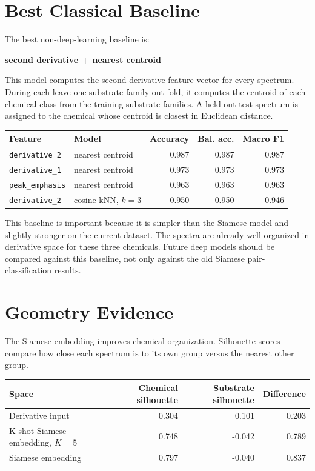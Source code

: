 \documentclass[11pt]{article}
\begin{document}
\section*{Best Classical Baseline}

The best non-deep-learning baseline is:

\begin{center}
\textbf{second derivative + nearest centroid}
\end{center}

This model computes the second-derivative feature vector for every spectrum. During each leave-one-substrate-family-out fold, it computes the centroid of each chemical class from the training substrate families. A held-out test spectrum is assigned to the chemical whose centroid is closest in Euclidean distance.

\begin{center}
\begin{tabular}{llrrr}
\toprule
\textbf{Feature} & \textbf{Model} & \textbf{Accuracy} & \textbf{Bal. acc.} & \textbf{Macro F1} \\
\midrule
\texttt{derivative\_2} & nearest centroid & 0.987 & 0.987 & 0.987 \\
\texttt{derivative\_1} & nearest centroid & 0.973 & 0.973 & 0.973 \\
\texttt{peak\_emphasis} & nearest centroid & 0.963 & 0.963 & 0.963 \\
\texttt{derivative\_2} & cosine kNN, $k=3$ & 0.950 & 0.950 & 0.946 \\
\bottomrule
\end{tabular}
\end{center}

This baseline is important because it is simpler than the Siamese model and slightly stronger on the current dataset. The spectra are already well organized in derivative space for these three chemicals. Future deep models should be compared against this baseline, not only against the old Siamese pair-classification results.

\section*{Geometry Evidence}

The Siamese embedding improves chemical organization. Silhouette scores compare how close each spectrum is to its own group versus the nearest other group.

\begin{center}
\begin{tabular}{lrrr}
\toprule
\textbf{Space} & \textbf{Chemical silhouette} & \textbf{Substrate silhouette} & \textbf{Difference} \\
\midrule
Derivative input & 0.304 & 0.101 & 0.203 \\
K-shot Siamese embedding, $K=5$ & 0.748 & -0.042 & 0.789 \\
Siamese embedding & 0.797 & -0.040 & 0.837 \\
\bottomrule
\end{tabular}
\end{center}
\end{document}
